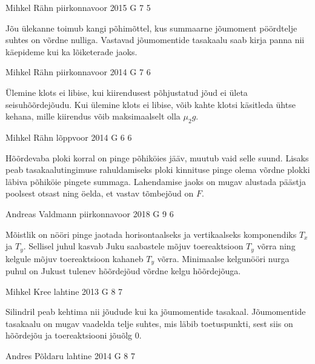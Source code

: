 \documentclass[11pt]{article}
\begin{document}
{%
{Mihkel Rähn} %
{piirkonnavoor} %
{2015} %
{G 7} %
{5} %
{

\ifHint
Jõu ülekanne toimub kangi põhimõttel, kus summaarne jõumoment pöördtelje suhtes on võrdne nulliga. Vastavad jõumomentide tasakaalu saab kirja panna nii käepideme kui ka lõiketerade jaoks.
\fi
}

{Mihkel Rähn} %
{piirkonnavoor} %
{2014} %
{G 7} %
{6} %
{

\ifHint
Ülemine klots ei libise, kui kiirendusest põhjustatud jõud ei ületa seisuhõõrdejõudu. Kui ülemine klots ei libise, võib kahte klotsi käsitleda ühtse kehana, mille kiirendus võib maksimaalselt olla $\mu_2g$.
\fi
}

{Mihkel Rähn} %
{lõppvoor} %
{2014} %
{G 6} %
{6} %
{

\ifHint
Hõõrdevaba ploki korral on pinge põhiköies jääv, muutub vaid selle suund. Lisaks peab tasakaalutingimuse rahuldamiseks ploki kinnituse pinge olema võrdne plokki läbiva põhiköie pingete summaga. Lahendamise jaoks on mugav alustada päästja poolsest otsast ning öelda, et vastav tõmbejõud on $F$.
\fi
}

{Andreas Valdmann} %
{piirkonnavoor} %
{2018} %
{G 9} %
{6} %
{

\ifHint
Mõistlik on nööri pinge jaotada horisontaalseks ja vertikaalseks komponendiks $T_x$ ja $T_y$. Sellisel juhul kasvab Juku saabastele mõjuv toereaktsioon $T_y$ võrra ning kelgule mõjuv toereaktsioon kahaneb $T_y$ võrra. Minimaalse kelgunööri nurga puhul on Jukust tulenev hõõrdejõud võrdne kelgu hõõrdejõuga.
\fi
}

{Mihkel Kree} %
{lahtine} %
{2013} %
{G 8} %
{7} %
{

\ifHint
Silindril peab kehtima nii jõudude kui ka jõumomentide tasakaal. Jõumomentide tasakaalu on mugav vaadelda telje suhtes, mis läbib toetuspunkti, sest siis on hõõrdejõu ja toereaktsiooni jõuõlg \num{0}.
\fi
}

{Andres Põldaru} %
{lahtine} %
{2014} %
{G 8} %
{7} %
{

}}
\end{document}
